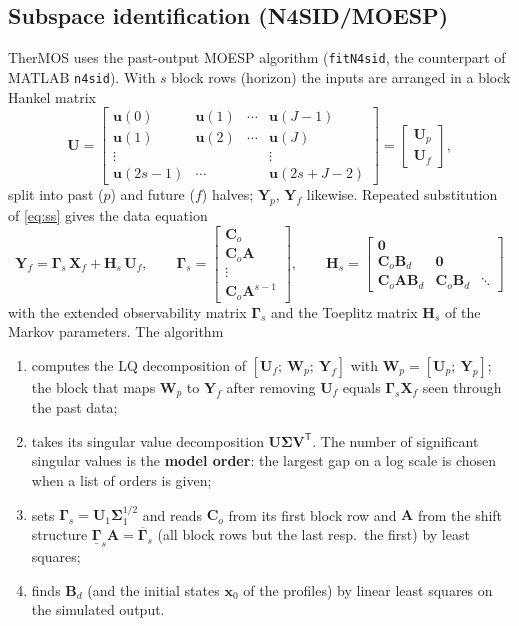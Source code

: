 \documentclass[11pt,a4paper]{article}
\newcommand{\T}{^{\mathsf T}}
\newcommand{\mat}[1]{\bm{#1}}
\begin{document}
\subsection{Subspace identification (N4SID/MOESP)}
TherMOS uses the past-output MOESP algorithm \cite{verhaegen,vanoverschee} (\texttt{fitN4sid}, the counterpart of
MATLAB \texttt{n4sid}). With $s$ block rows (horizon) the inputs are arranged in a block Hankel matrix
\begin{equation}
  \mat U = \begin{bmatrix} \bm u(0) & \bm u(1) & \cdots & \bm u(J-1)\\ \bm u(1) & \bm u(2) & \cdots & \bm u(J)\\
  \vdots & & & \vdots\\ \bm u(2s-1) & \cdots & & \bm u(2s+J-2)\end{bmatrix}
  = \begin{bmatrix}\mat U_p\\ \mat U_f\end{bmatrix},
\end{equation}
split into past ($p$) and future ($f$) halves; $\mat Y_p$, $\mat Y_f$ likewise. Repeated substitution of
\eqref{eq:ss} gives the data equation
\begin{equation}
  \mat Y_f = \bm\Gamma_s\,\mat X_f + \mat H_s\,\mat U_f,\qquad
  \bm\Gamma_s = \begin{bmatrix}\mat C_o\\ \mat C_o\mat A\\ \vdots\\ \mat C_o\mat A^{s-1}\end{bmatrix},\qquad
  \mat H_s = \begin{bmatrix}\mat 0 & & \\ \mat C_o\mat B_d & \mat 0 & \\ \mat C_o\mat A\mat B_d & \mat C_o\mat B_d &
  \ddots\end{bmatrix}
\end{equation}
with the extended observability matrix $\bm\Gamma_s$ and the Toeplitz matrix $\mat H_s$ of the Markov parameters.
The algorithm
\begin{enumerate}
  \item computes the LQ decomposition of $[\mat U_f;\ \mat W_p;\ \mat Y_f]$ with $\mat W_p=[\mat U_p;\ \mat Y_p]$; the
        block that maps $\mat W_p$ to $\mat Y_f$ after removing $\mat U_f$ equals $\bm\Gamma_s\mat X_f$ seen through
        the past data;
  \item takes its singular value decomposition $\mat U\bm\Sigma\mat V\T$. The number of significant singular values is
        the \textbf{model order}: the largest gap on a log scale is chosen when a list of orders is given;
  \item sets $\bm\Gamma_s=\mat U_1\bm\Sigma_1^{1/2}$ and reads $\mat C_o$ from its first block row and $\mat A$ from
        the shift structure $\underline{\bm\Gamma}_s\mat A = \overline{\bm\Gamma}_s$ (all block rows but the last
        resp.\ the first) by least squares;
  \item finds $\mat B_d$ (and the initial states $\bm x_0$ of the profiles) by linear least squares on the simulated
        output.
\end{enumerate}
\end{document}
